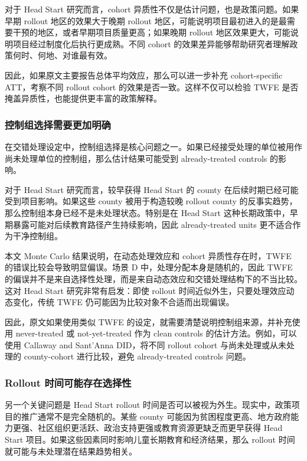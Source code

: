 \documentclass[
  fontset=windows]{ctexart}
\begin{document}
对于 Head Start 研究而言，cohort
异质性不仅是估计问题，也是政策问题。如果早期 rollout 地区的效果大于晚期
rollout
地区，可能说明项目最初进入的是最需要干预的地区，或者早期项目质量更高；如果晚期
rollout 地区效果更大，可能说明项目经过制度化后执行更成熟。不同 cohort
的效果差异能够帮助研究者理解政策何时、何地、对谁最有效。

因此，如果原文主要报告总体平均效应，那么可以进一步补充 cohort-specific
ATT，考察不同 rollout cohort 的效果是否一致。这样不仅可以检验 TWFE
是否掩盖异质性，也能提供更丰富的政策解释。

\subsubsection{控制组选择需要更加明确}\label{ux63a7ux5236ux7ec4ux9009ux62e9ux9700ux8981ux66f4ux52a0ux660eux786e}

在交错处理设定中，控制组选择是核心问题之一。如果已经接受处理的单位被用作尚未处理单位的控制组，那么估计结果可能受到
already-treated controls 的影响。

对于 Head Start 研究而言，较早获得 Head Start 的 county
在后续时期已经可能受到项目影响。如果这些 county 被用于构造较晚 rollout
county 的反事实趋势，那么控制组本身已经不是未处理状态。特别是在 Head
Start 这种长期政策中，早期暴露可能对后续教育路径产生持续影响，因此
already-treated units 更不适合作为干净控制组。

本文 Monte Carlo 结果说明，在动态处理效应和 cohort 异质性存在时，TWFE
的错误比较会导致明显偏误。场景 D 中，处理分配本身是随机的，因此 TWFE
的偏误并不是来自选择性处理，而是来自动态效应和交错处理结构下的不当比较。这对
Head Start 研究非常有启发：即使 rollout
时间近似外生，只要处理效应动态变化，传统 TWFE
仍可能因为比较对象不合适而出现偏误。

因此，原文如果使用类似 TWFE 的设定，就需要清楚说明控制组来源，并补充使用
never-treated 或 not-yet-treated 作为 clean controls
的估计方法。例如，可以使用 Callaway and Sant'Anna DID，将不同 rollout
cohort 与尚未处理或从未处理的 county-cohort 进行比较，避免
already-treated controls 问题。

\subsubsection{Rollout
时间可能存在选择性}\label{rollout-ux65f6ux95f4ux53efux80fdux5b58ux5728ux9009ux62e9ux6027}

另一个关键问题是 Head Start rollout
时间是否可以被视为外生。现实中，政策项目的推广通常不是完全随机的。某些
county
可能因为贫困程度更高、地方政府能力更强、社区组织更活跃、政治支持更强或教育资源更缺乏而更早获得
Head Start 项目。如果这些因素同时影响儿童长期教育和经济结果，那么
rollout 时间就可能与未处理潜在结果趋势相关。
\end{document}

